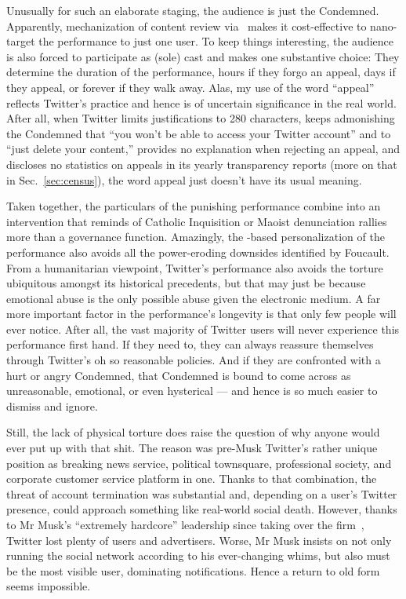 Unusually for such an elaborate staging, the audience is just the Condemned.
Apparently, mechanization of content review via \AI\ makes it cost-effective to
nano-target the performance to just one user. To keep things interesting, the
audience is also forced to participate as (sole) cast and makes one substantive
choice: They determine the duration of the performance, hours if they forgo an
appeal, days if they appeal, or forever if they walk away. Alas, my use of the
word ``appeal'' reflects Twitter's practice and hence is of uncertain
significance in the real world. After all, when Twitter limits justifications to
280 characters, keeps admonishing the Condemned that ``you won't be able to
access your Twitter account'' and to ``just delete your content,'' provides no
explanation when rejecting an appeal, and discloses no statistics on appeals in
its yearly transparency reports (more on that in Sec.~\ref{sec:census}), the
word appeal just doesn't have its usual meaning.

Taken together, the particulars of the punishing performance combine into an
intervention that reminds of Catholic Inquisition or Maoist denunciation rallies
more than a governance function. Amazingly, the \AI-based personalization of the
performance also avoids all the power-eroding downsides identified by Foucault.
From a humanitarian viewpoint, Twitter's performance also avoids the torture
ubiquitous amongst its historical precedents, but that may just be because
emotional abuse is the only possible abuse given the electronic medium. A far
more important factor in the performance's longevity is that only few people
will ever notice. After all, the vast majority of Twitter users will never
experience this performance first hand. If they need to, they can always
reassure themselves through Twitter's oh so reasonable policies. And if they are
confronted with a hurt or angry Condemned, that Condemned is bound to come
across as unreasonable, emotional, or even hysterical --- and hence is so much
easier to dismiss and ignore.

Still, the lack of physical torture does raise the question of why anyone would
ever put up with that shit. The reason was pre-Musk Twitter's rather unique
position as breaking news service, political townsquare, professional society,
and corporate customer service platform in one. Thanks to that combination, the
threat of account termination was substantial and, depending on a user's Twitter
presence, could approach something like real-world social death. However, thanks
to Mr Musk's ``extremely hardcore'' leadership since taking over the
firm~\cite{SchifferNewtonea2023}, Twitter lost plenty of users and advertisers.
Worse, Mr Musk insists on not only running the social network according to his
ever-changing whims, but also must be the most visible user, dominating
notifications. Hence a return to old form seems impossible.


